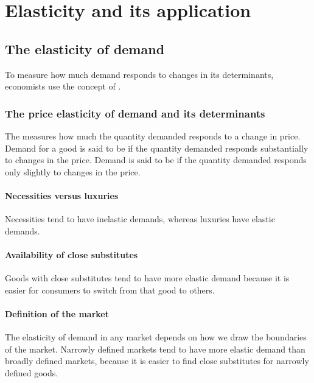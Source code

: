 
\chapter{Elasticity and its application}

\section{The elasticity of demand}

To measure how much demand responds to changes in its determinants, economists use the concept of .

\subsection{The price elasticity of demand and its determinants}

The  measures how much the quantity demanded responds to a change in price.
Demand for a good is said to be  if the quantity demanded responds substantially to changes in the price.
Demand is said to be  if the quantity demanded responds only slightly to changes in the price.


\subsubsection{Necessities versus luxuries}

Necessities tend to have inelastic demands, whereas luxuries have elastic demands.


\subsubsection{Availability of close substitutes}

Goods with close substitutes tend to have more elastic demand because it is easier for consumers to switch from that good to others.

\subsubsection{Definition of the market}

The elasticity of demand in any market depends on how we draw the boundaries of the market.
Narrowly defined markets tend to have more elastic demand than broadly defined markets,
because it is easier to find close substitutes for narrowly defined goods. 

